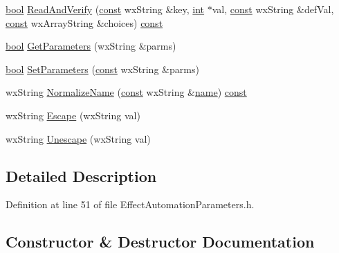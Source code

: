 \begin{DoxyCompactItemize}
\item 
\hyperlink{mac_2config_2i386_2lib-src_2libsoxr_2soxr-config_8h_abb452686968e48b67397da5f97445f5b}{bool} \hyperlink{class_effect_automation_parameters_a083d91cbd9e7ef4ef8ea578b7a1242b6}{Read\+And\+Verify} (\hyperlink{getopt1_8c_a2c212835823e3c54a8ab6d95c652660e}{const} wx\+String \&key, \hyperlink{xmltok_8h_a5a0d4a5641ce434f1d23533f2b2e6653}{int} $\ast$val, \hyperlink{getopt1_8c_a2c212835823e3c54a8ab6d95c652660e}{const} wx\+String \&def\+Val, \hyperlink{getopt1_8c_a2c212835823e3c54a8ab6d95c652660e}{const} wx\+Array\+String \&choices) \hyperlink{getopt1_8c_a2c212835823e3c54a8ab6d95c652660e}{const} 
\item 
\hyperlink{mac_2config_2i386_2lib-src_2libsoxr_2soxr-config_8h_abb452686968e48b67397da5f97445f5b}{bool} \hyperlink{class_effect_automation_parameters_a1c986c0b95abeab0e569163511926a92}{Get\+Parameters} (wx\+String \&parms)
\item 
\hyperlink{mac_2config_2i386_2lib-src_2libsoxr_2soxr-config_8h_abb452686968e48b67397da5f97445f5b}{bool} \hyperlink{class_effect_automation_parameters_a6826ab327ba87061f97e6961c48da03e}{Set\+Parameters} (\hyperlink{getopt1_8c_a2c212835823e3c54a8ab6d95c652660e}{const} wx\+String \&parms)
\item 
wx\+String \hyperlink{class_effect_automation_parameters_ae219ab6c414bf4c2f05bea126b43f4b9}{Normalize\+Name} (\hyperlink{getopt1_8c_a2c212835823e3c54a8ab6d95c652660e}{const} wx\+String \&\hyperlink{lib_2expat_8h_a1b49b495b59f9e73205b69ad1a2965b0}{name}) \hyperlink{getopt1_8c_a2c212835823e3c54a8ab6d95c652660e}{const} 
\item 
wx\+String \hyperlink{class_effect_automation_parameters_a9beaccb921e9c4b250d0a5475744ff3c}{Escape} (wx\+String val)
\item 
wx\+String \hyperlink{class_effect_automation_parameters_ad3aef487ff8a637986b3b08508e91021}{Unescape} (wx\+String val)
\end{DoxyCompactItemize}


\subsection{Detailed Description}


Definition at line 51 of file Effect\+Automation\+Parameters.\+h.



\subsection{Constructor \& Destructor Documentation}
